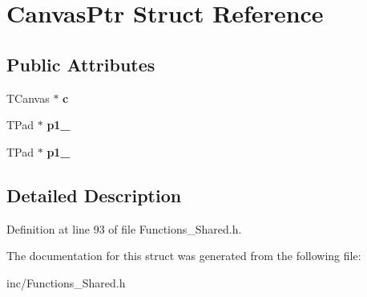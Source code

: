 \hypertarget{structCanvasPtr}{\section{Canvas\-Ptr Struct Reference}
\label{structCanvasPtr}
}
\subsection*{Public Attributes}
\begin{DoxyCompactItemize}
\item 
\hypertarget{structCanvasPtr_a43aa501c472e73caeb5c1c44d141c43a}{T\-Canvas $\ast$ {\bfseries c}}\label{structCanvasPtr_a43aa501c472e73caeb5c1c44d141c43a}

\item 
\hypertarget{structCanvasPtr_a6f9aae5eca044d2c731db354cb38c9c6}{T\-Pad $\ast$ {\bfseries p1\-\_}}\label{structCanvasPtr_a6f9aae5eca044d2c731db354cb38c9c6}

\item 
\hypertarget{structCanvasPtr_a49f2e1a75298107884977f77641e45f8}{T\-Pad $\ast$ {\bfseries p1\-\_}}\label{structCanvasPtr_a49f2e1a75298107884977f77641e45f8}

\end{DoxyCompactItemize}


\subsection{Detailed Description}


Definition at line 93 of file Functions\-\_\-\-Shared.\-h.



The documentation for this struct was generated from the following file\-:\begin{DoxyCompactItemize}
\item 
inc/Functions\-\_\-\-Shared.\-h\end{DoxyCompactItemize}
